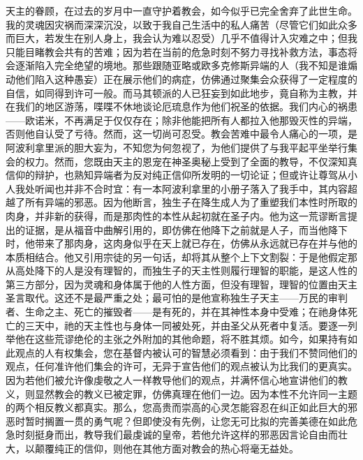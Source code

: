 天主的眷顾，在过去的岁月中一直守护着教会，如今似乎已完全舍弃了此世生命。我的灵魂因灾祸而深深沉没，以致于我自己生活中的私人痛苦（尽管它们如此众多而巨大，若发生在别人身上，我会认为难以忍受）几乎不值得计入灾难之中；但我只能目睹教会共有的苦难；因为若在当前的危急时刻不努力寻找补救方法，事态将会逐渐陷入完全绝望的境地。那些跟随亚略或欧多克修斯异端的人（我不知是谁煽动他们陷入这种愚妄）正在展示他们的病症，仿佛通过聚集会众获得了一定程度的自信，如同得到许可一般。而马其顿派的人已狂妄到如此地步，竟自称为主教，并在我们的地区游荡，喋喋不休地谈论厄琉息作为他们祝圣的依据。我们内心的祸患——欧诺米，不再满足于仅仅存在；除非他能把所有人都拉入他那毁灭性的异端，否则他自认受了亏待。然而，这一切尚可忍受。教会苦难中最令人痛心的一项，是阿波利拿里派的胆大妄为，不知您为何忽视了，为他们提供了与我平起平坐举行集会的权力。然而，您既由天主的恩宠在神圣奥秘上受到了全面的教导，不仅深知真信仰的辩护，也熟知异端者为反对纯正信仰所发明的一切论证；但或许让尊驾从小人我处听闻也并非不合时宜：有一本阿波利拿里的小册子落入了我手中，其内容超越了所有异端的邪恶。因为他断言，独生子在降生成人为了重塑我们本性时所取的肉身，并非新的获得，而是那肉性的本性从起初就在圣子内。他为这一荒谬断言提出的证据，是从福音中曲解引用的，即仿佛在他降下之前就是人子，而当他降下时，他带来了那肉身，这肉身似乎在天上就已存在，仿佛从永远就已存在并与他的本质相结合。他又引用宗徒的另一句话，却将其从整个上下文割裂：于是他假定那从高处降下的人是没有理智的，而独生子的天主性则履行理智的职能，是这人性的第三方部分，因为灵魂和身体属于他的人性方面，但没有理智，理智的位置由天主圣言取代。这还不是最严重之处；最可怕的是他宣称独生子天主——万民的审判者、生命之主、死亡的摧毁者——是有死的，并在其神性本身中受难；在祂身体死亡的三天中，祂的天主性也与身体一同被处死，并由圣父从死者中复活。要逐一列举他在这些荒谬绝伦的主张之外附加的其他命题，将不胜其烦。如今，如果持有如此观点的人有权集会，您在基督内被认可的智慧必须看到：由于我们不赞同他们的观点，任何准许他们集会的许可，无异于宣告他们的观点被认为比我们的更真实。因为若他们被允许像虔敬之人一样教导他们的观点，并满怀信心地宣讲他们的教义，则显然教会的教义已被定罪，仿佛真理在他们一边。因为本性不允许同一主题的两个相反教义都真实。那么，您高贵而崇高的心灵怎能容忍在纠正如此巨大的邪恶时暂时搁置一贯的勇气呢？但即使没有先例，让您无可比拟的完善美德在如此危急时刻挺身而出，教导我们最虔诚的皇帝，若他允许这样的邪恶因言论自由而壮大，以颠覆纯正的信仰，则他在其他方面对教会的热心将毫无益处。\par


